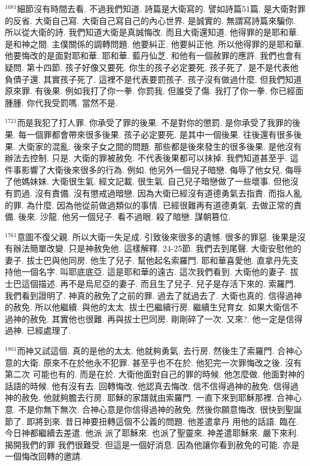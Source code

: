 \documentclass{book}
\begin{document}
$^{1681}$細節沒有時間去看.
不過我們知道.
詩篇是大衛寫的.
譬如詩篇51篇.
是大衛對罪的反省.
大衛自己寫.
大衛自己寫自己的內心世界.
是誠實的.
無謂寫詩篇來騙你.
所以從大衛的詩.
我們知道大衛是真誠悔改.
而且大衛還知道.
他得罪的是耶和華.
是和神之間.
主僕關係的調轉問題.
他要糾正.
他要糾正他.
所以他得罪的是耶和華.
他要悔改的是面對耶和華.
耶和華.
藍丹仙芝.
和他有一個赦罪的應許.
我們也會有疑問.
第十四節.
孩子好像又要死.
你生的孩子必定要死.
孩子死了.
是不是代表他負債子還.
其實孩子死了.
這裡不是代表要罰孩子.
孩子沒有做過什麼.
但我們知道原來罪.
有後果.
例如我打了你一拳.
你罰我.
但誰受了傷.
我打了你一拳.
你已經面腫腫.
你代我受罰嗎.
當然不是.

$^{1721}$而是我犯了打人罪.
你承受了罪的後果.
不是對你的懲罰.
是你承受了我罪的後果.
每一個罪都會帶來很多後果.
孩子必定要死.
是其中一個後果.
往後還有很多後果.
大衛家的混亂.
後來子女之間的問題.
那些都是後來發生的很多後果.
是他沒有辦法去控制.
只是.
大衛的罪被赦免.
不代表後果都可以抹掉.
我們知道甚至乎.
這件事影響了大衛後來很多的行為.
例如.
他另外一個兒子暗戀.
侮辱了他女兒.
侮辱了他媽妹妹.
大衛很生氣.
經文記載.
很生氣.
自己兒子暗戀做了一些壞事.
但他沒有罰過.
沒有責備.
沒有懲戒過暗戀.
因為大衛已經沒有道德勇氣去指責.
而指人亂的罪.
為什麼.
因為他從前做過類似的事情.
已經很難再有道德勇氣.
去做正常的責備.
後來.
沙龍.
他另一個兒子.
看不過眼.
殺了暗戀.
謀朝篡位.

$^{1761}$意圖不復父親.
所以大衛一失足成.
引致後來很多的遺憾.
很多的罪惡.
後果是沒有辦法簡單改變.
只是神赦免他.
這樣解釋.
24-25節.
我們去到尾聲.
大衛安慰他的妻子.
拔士巴與他同房.
他生了兒子.
幫他起名索羅門.
耶和華喜愛他.
直拿丹先支持他一個名字.
叫耶底底亞.
這是耶和華的遠古.
這次我們看到.
大衛他的妻子.
拔士巴這個描述.
再不是烏尼亞的妻子.
而且生了兒子.
兒子是存活下來的.
索羅門.
我們看到證明了.
神真的赦免了之前的罪.
過去了就過去了.
大衛也真的.
信得過神的赦免.
所以他繼續.
與他的太太.
拔士巴繼續行房.
繼續生兒育女.
如果大衛信不過神的赦免.
其實他也很難.
再與拔士巴同房.
剛剛碎了一次.
又來?.
他一定是信得過神.
已經處理了.

$^{1801}$而神又試這個.
真的是他的太太.
他就夠勇氣.
去行房.
然後生了索羅門.
合神心意的大衛.
原來不在於他永不犯罪.
甚至乎也不在於.
他犯完一次罪悔改之後.
沒有第二次 可能也有的.
而是在於.
大衛他面對自己的罪的時候.
他怎麼做.
他面對神的話語的時候.
他有沒有去.
回轉悔改.
他認真去悔改.
信不信得過神的赦免.
信得過神的赦免.
他就夠膽去行房.
耶穌的家譜就由索羅門.
一直下來到耶穌那裡.
合神心意.
不是你無下無次.
合神心意是你信得過神的赦免.
然後你願意悔改.
很快到聖誕節了.
即將到來.
昔日神要扭轉這個不公義的問題.
他差遣拿丹 用他的話語.
臨在.
今日神都繼續去差遣.
他派 派了耶穌來.
也派了聖靈來.
神差遣耶穌來.
嚴下來利.
揭開我們的罪 我們很難受.
但這是一個好消息.
因為他讓你看到赦免的可能.
亦是一個悔改回轉的邀請.
\end{document}
